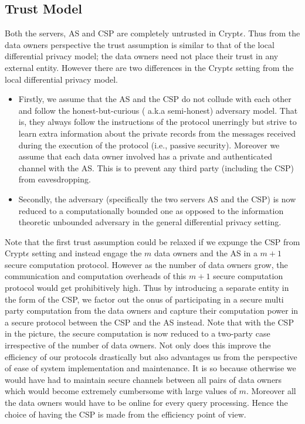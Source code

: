 \subsection{Trust Model}
Both the servers, AS and CSP are completely untrusted in Crypt$\epsilon$. 
Thus from the data owners perspective the trust assumption is similar to that of the local differential privacy model; the data owners need not  place their trust in any external entity. 
However there are two differences in the Crypt$\epsilon$ setting from the local differential privacy model.
\begin{itemize}\item Firstly, we assume that the AS and the CSP do not collude with each other and follow the honest-but-curious ( a.k.a semi-honest) adversary model. That is, they always follow the instructions of the protocol unerringly but strive to learn extra information about the private records from the messages received during the execution of the protocol (i.e., passive security). Moreover we assume that each data owner involved has a private and authenticated channel with the AS. This is to prevent any third party (including the CSP) from eavesdropping.  \item Secondly, the adversary (specifically the two servers AS and the CSP) is now reduced to a computationally bounded one as opposed to the information theoretic unbounded adversary in the general differential privacy setting.\end{itemize}
Note that the first trust assumption could be relaxed if we expunge the CSP from Crypt$\epsilon$ setting and instead engage the $m$ data owners and the AS in a $m+1$ secure computation protocol. However as the number of data owners grow, the communication and computation overheads of this $m+1$ secure computation protocol would get prohibitively high. Thus by introducing a separate entity in the form of the CSP, we factor out the onus of participating in a secure multi party computation from the data owners and capture their computation power in a secure protocol between the CSP and the AS instead. Note that with the CSP in the picture, the secure computation is now reduced to a two-party case irrespective of the number of data owners. Not only does this improve the efficiency of our protocols drastically but also advantages us from the perspective of ease of system implementation and maintenance. It is so because otherwise we would have had to maintain secure channels between all pairs of data owners which would become extremely cumbersome with large values of $m$. Moreover all the data owners would have to be online for every query processing. Hence the choice of having the CSP is made from the efficiency point of view.
